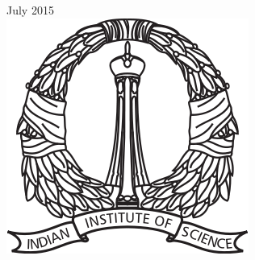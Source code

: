 \documentclass[12pt, titlepage]{article}
\theoremstyle{definition}
\begin{document}
\begin{titlepage}

{\large July 2015}\\[2cm] %


\includegraphics[scale=0.7]{images/logo.png}\\[1cm] %
 

\vfill %

\end{titlepage}

\section*{\centering{\fontsize{50}{60} \selectfont{Acknowledgements}}}
\end{document}
